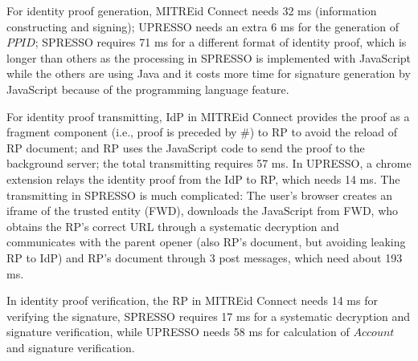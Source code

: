 For identity proof generation, MITREid Connect needs 32 ms (information constructing and signing); UPRESSO needs an extra 6 ms for the generation of $PPID$;  SPRESSO requires 71 ms for a different format of identity proof, which is longer than others as the processing in SPRESSO is implemented with JavaScript while the others are using Java and it costs more time for signature generation by JavaScript because of the programming language feature.

For identity proof transmitting, IdP in  MITREid Connect provides the proof as a fragment component (i.e., proof is preceded by \#) to RP to avoid the reload of RP document; and RP uses the JavaScript code to send the proof to the background server; the total transmitting requires 57 ms. In UPRESSO, a chrome extension relays the identity proof from the IdP to RP, which needs 14 ms. The transmitting in SPRESSO is much complicated: The user's browser creates an iframe of the trusted entity (FWD), downloads the JavaScript from FWD, who obtains the RP's correct URL through a systematic decryption and communicates with the parent opener (also RP's document, but avoiding leaking RP to IdP) and RP's document through 3 post messages, which need about 193 ms.

In identity proof verification, the RP in MITREid Connect needs 14 ms for verifying the signature, SPRESSO requires 17 ms for a systematic decryption and signature verification, while UPRESSO needs 58 ms for calculation of $Account$ and signature verification.

